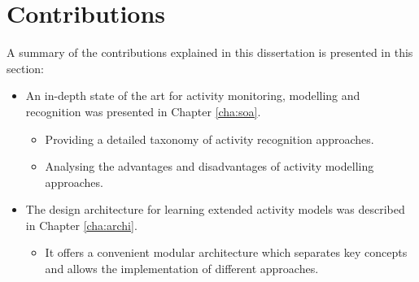 \section{Contributions}
\label{sec:conclusions:contrib}

A summary of the contributions explained in this dissertation is presented in this section:

\begin{itemize}
 \item An in-depth state of the art for activity monitoring, modelling and recognition was presented in Chapter \ref{cha:soa}.
 \begin{itemize}
  \item Providing a detailed taxonomy of activity recognition approaches.
  \item Analysing the advantages and disadvantages of activity modelling approaches.
 \end{itemize}

 \begin{comment}
 \item A knowledge representation formalism for activities and intelligent environments was presented in Chapter \ref{cha:archi}.
 \begin{itemize}
  \item It offers a light-weight knowledge representation and processing framework based on JavaScript Object Notation (JSON) technology.
  \item It uses compact and easy-to-extend structures for activities, objects, locations and sensors, to achieve environment independence.
 \end{itemize}
 \end{comment}

 \item The design architecture for learning extended activity models was described in Chapter \ref{cha:archi}.
 \begin{itemize}
  \item It offers a convenient modular architecture which separates key concepts and allows the implementation of different approaches.
 \end{itemize}


\end{itemize}
